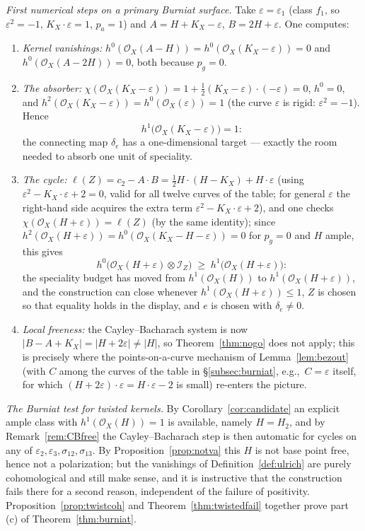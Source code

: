 \documentclass{amsart}
\theoremstyle{definition}
\newcommand{\OO}{\mathcal{O}}
\newcommand{\II}{\mathcal{I}}
\newcommand{\len}{\ell}
\begin{document}
\smallskip
\noindent \emph{First numerical steps on a primary Burniat surface.} Take $\varepsilon=\varepsilon_1$ (class $f_1$, so $\varepsilon^2=-1$, $K_X\cdot\varepsilon=1$, $p_a=1$) and $A=H+K_X-\varepsilon$, $B=2H+\varepsilon$. One computes:
\begin{enumerate}[label=\textup{(\alph*)}]
\item \emph{Kernel vanishings:} $h^0(\OO_X(A-H))=h^0(\OO_X(K_X-\varepsilon))=0$ and $h^0(\OO_X(A-2H))=0$, both because $p_g=0$.
\item \emph{The absorber:} $\chi(\OO_X(K_X-\varepsilon))=1+\tfrac12(K_X-\varepsilon)\cdot(-\varepsilon)=0$, $h^0=0$, and $h^2(\OO_X(K_X-\varepsilon))=h^0(\OO_X(\varepsilon))=1$ (the curve $\varepsilon$ is rigid: $\varepsilon^2=-1$). Hence
\[
h^1\bigl(\OO_X(K_X-\varepsilon)\bigr)=1 :
\]
the connecting map $\delta_e$ has a one-dimensional target --- exactly the room needed to absorb one unit of speciality.
\item \emph{The cycle:} $\len(Z)=c_2-A\cdot B=\tfrac12H\cdot(H-K_X)+H\cdot\varepsilon$ \textup{(}using $\varepsilon^2-K_X\cdot\varepsilon+2=0$, valid for all twelve curves of the table; for general $\varepsilon$ the right-hand side acquires the extra term $\varepsilon^2-K_X\cdot\varepsilon+2$\textup{)}, and one checks $\chi(\OO_X(H+\varepsilon))=\len(Z)$ \textup{(}by the same identity\textup{)}; since $h^2(\OO_X(H+\varepsilon))=h^0(\OO_X(K_X-H-\varepsilon))=0$ for $p_g=0$ and $H$ ample, this gives
\[
h^0\bigl(\OO_X(H+\varepsilon)\otimes\II_Z\bigr)\;\ge\;h^1\bigl(\OO_X(H+\varepsilon)\bigr):
\]
the speciality budget has moved from $h^1(\OO_X(H))$ to $h^1(\OO_X(H+\varepsilon))$, and the construction can close whenever $h^1(\OO_X(H+\varepsilon))\le1$, $Z$ is chosen so that equality holds in the display, and $e$ is chosen with $\delta_e\neq0$.
\item \emph{Local freeness:} the Cayley--Bacharach system is now $|B-A+K_X|=|H+2\varepsilon|\neq|H|$, so Theorem~\ref{thm:nogo} does not apply; this is precisely where the points-on-a-curve mechanism of Lemma~\ref{lem:bezout} (with $C$ among the curves of the table in \S\ref{subsec:burniat}, e.g.,\ $C=\varepsilon$ itself, for which $(H+2\varepsilon)\cdot\varepsilon=H\cdot\varepsilon-2$ is small) re-enters the picture.
\end{enumerate}
\smallskip
\noindent \emph{The Burniat test for twisted kernels.} By Corollary~\ref{cor:candidate} an explicit ample class with $h^1(\OO_X(H))=1$ is available, namely $H=H_2$, and by Remark~\ref{rem:CBfree} the Cayley--Bacharach step is then automatic for cycles on any of $\varepsilon_2,\varepsilon_3,\sigma_{12},\sigma_{13}$. By Proposition~\ref{prop:notva} this $H$ is not base point free, hence not a polarization; but the vanishings of Definition~\ref{def:ulrich} are purely cohomological and still make sense, and it is instructive that the construction fails there for a second reason, independent of the failure of positivity. Proposition~\ref{prop:twistcoh} and Theorem~\ref{thm:twistedfail} together prove part (c) of Theorem~\ref{thm:burniat}.
\end{document}
